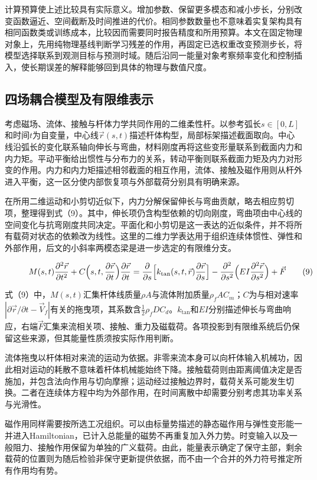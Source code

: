 计算预算使上述比较具有实际意义。增加参数、保留更多模态和减小步长，分别改变函数逼近、空间截断及时间推进的代价。相同参数数量也不意味着实复架构具有相同函数类或训练成本，比较因而需要同时报告精度和所用预算。本文在固定物理对象上，先用纯物理基线判断学习残差的作用，再固定已选权重改变预测步长，将模型选择联系到观测目标与预测时域。随后沿同一能量对象考察频率变化和控制插入，使长期误差的解释能够回到具体的物理与数值尺度。

\subsection{四场耦合模型及有限维表示}

考虑磁场、流体、接触与杆体力学共同作用的二维柔性杆。以参考弧长$s\in[0,L]$和时间$t$为自变量，中心线$\vec r(s,t)$描述杆体构型，局部标架描述截面取向。中心线沿弧长的变化联系轴向伸长与弯曲，材料刚度再将这些变形量联系到截面内力和内力矩。平动平衡给出惯性与分布力的关系，转动平衡则联系截面力矩及内力对形变的作用。内力和内力矩描述相邻截面的相互作用，流体、接触及磁作用则从杆外进入平衡，这一区分使内部恢复项与外部载荷分别具有明确来源。

在所用二维运动和小剪切近似下，内力分解保留伸长与弯曲贡献，略去相应剪切项，整理得到式（9）。其中，伸长项仍含构型依赖的切向刚度，弯曲项由中心线的空间变化与抗弯刚度共同决定。平面化和小剪切是这一表达的近似条件，并不将所有载荷对状态的依赖改为线性。这里的二维力学表达用于组织连续体惯性、弹性和外部作用，后文的小斜率两模态梁是进一步选定的有限维分支。

\begin{figure}[t]
  \begin{equation}
    M(s,t)\frac{\partial^2\vec r}{\partial t^2} +C\Bigl(s,t,\frac{\partial\vec r}{\partial t}\Bigr)\frac{\partial\vec r}{\partial t} =\frac{\partial}{\partial s}\Bigl[k_{\mathrm{tan}}(s,t,\vec r)\frac{\partial\vec r}{\partial s}\Bigr] -\frac{\partial^2}{\partial s^2}\Bigl(EI\frac{\partial^2\vec r}{\partial s^2}\Bigr)+\vec F
    \tag{9}\label{eq:source9}
  \end{equation}
\end{figure}

式（9）中，$M(s,t)$汇集杆体线质量$\rho A$与流体附加质量$\rho_fAC_m$；$C$为与相对速率$|\partial\vec r/\partial t-\vec V_f|$有关的拖曳项，其系数含$\tfrac12\rho_fDC_d$。$k_{\mathrm{tan}}$和$EI$分别描述伸长与弯曲响应，右端$\vec F$汇集来流相关项、接触、重力及磁载荷。各项投影到有限维系统后仍保留这些来源，但其能量性质须按实际作用判断。

流体拖曳以杆体相对来流的运动为依据。非零来流本身可以向杆体输入机械功，因此相对运动的耗散不意味着杆体机械能始终下降。接触载荷则由距离阈值决定是否施加，并包含法向作用与切向摩擦；运动经过接触边界时，载荷关系可能发生切换。二者在连续体方程中均为外部作用，在时间离散中却需要分别考虑其功率关系与光滑性。

磁作用同样需要按所选工况组织。可以由标量势描述的静态磁作用与弹性变形能一并进入Hamiltonian，已计入总能量的磁势不再重复加入外力势。时变输入以及一般阻力、接触作用保留为单独的广义载荷。由此，能量表示确定了保守主部，剩余载荷的位置则为随后检验非保守更新提供依据，而不由一个合并的外力符号推定所有作用均有势。


